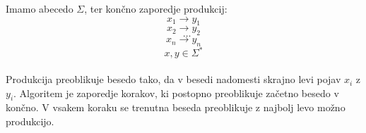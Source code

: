 \documentclass[10pt,a4paper,oneside]{book}
\begin{document}


Imamo abecedo $\Sigma$, ter končno zaporedje produkcij:\\
\[ x_1 \rightarrow y_1 \]
\[ x_2 \rightarrow y_2 \]
\[ \ \ \ \dots \]
\[ x_n \rightarrow y_n \]
\[ x,y \in \Sigma^* \]%
\\
Produkcija preoblikuje besedo tako, da v besedi nadomesti skrajno levi pojav $x_i$ z $y_i$. %
Algoritem je zaporedje korakov, ki postopno preoblikuje začetno besedo v končno. V vsakem koraku se trenutna beseda preoblikuje z najbolj levo možno produkcijo.
\end{document}
